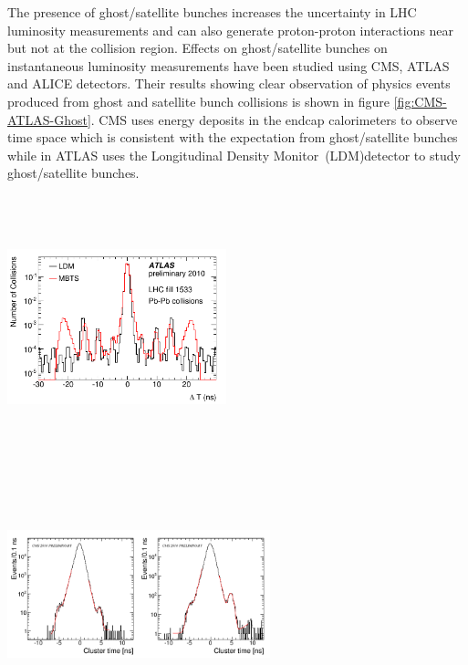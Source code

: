The presence of ghost/satellite bunches increases the uncertainty in LHC luminosity measurements and can also generate proton-proton interactions near but not at the collision region. Effects on ghost/satellite bunches on instantaneous luminosity measurements have been studied 
using CMS, ATLAS and ALICE detectors.  Their results showing clear observation of physics events produced from
ghost and satellite bunch collisions is shown in figure \ref{fig:CMS-ATLAS-Ghost}.
CMS uses energy deposits in the endcap calorimeters to observe time space which is consistent with the expectation from ghost/satellite bunches while in ATLAS
 uses the Longitudinal Density Monitor~(LDM)detector to study ghost/satellite bunches. 
\begin{center}
\centering
\mbox{\includegraphics[height=3.0in,width=2.5in]{THESISPLOTS/ATLAS-LDM-GHOST.png} \quad \quad
\includegraphics[height=3.0in,width=3.0in]{THESISPLOTS/CMS-Ghost-Profile.png}} 
\label{fig:CMS-ATLAS-Ghost}
\end{center}
